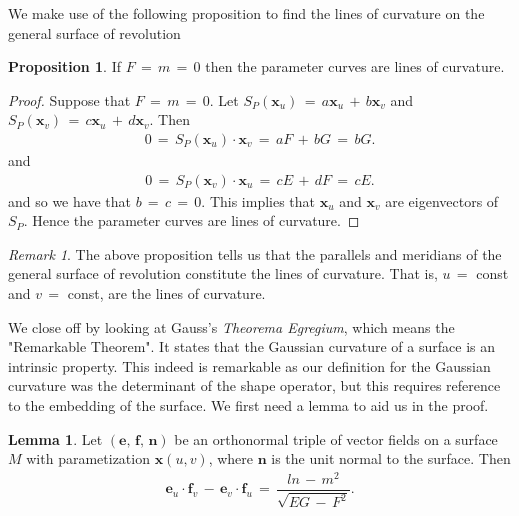 \documentclass{UKZNcomp}
\newcommand{\vect}[1]{\mathbf{#1}} %
\theoremstyle{definition}
\newtheorem{prop}[definition]{Proposition}
\newtheorem{lemma}[definition]{Lemma}
\theoremstyle{remark}
\newtheorem*{remark}{Remark}
\begin{document}
We make use of the following proposition to find the lines of curvature on the general surface of revolution

\begin{prop}
If $F\,=\,m\,=\,0$ then the parameter curves are lines of curvature.
\end{prop}

\begin{proof}
Suppose that $F\,=\,m\,=\,0$. Let $S_P(\vect x_u)\,=\,a\vect x_u\,+\,b\vect x_v$ and $S_P(\vect x_v)\,=\,c\vect x_u\,+\,d\vect x_v$. Then
\begin{align*}
0\,=\,S_P(\vect x_u)\cdot\vect x_v\,=\,aF\,+\,bG\,=\,bG.
\end{align*}
and
\begin{align*}
0\,=\,S_P(\vect x_v)\cdot\vect x_u\,=\,cE\,+\,dF\,=\,cE.
\end{align*}
and so we have that $b\,=\,c\,=\,0$. This implies that $\vect x_u$ and $\vect x_v$ are eigenvectors of $S_P$. Hence the parameter curves are lines of curvature. 
\end{proof}

\begin{remark}
The above proposition tells us that the parallels and meridians of the general surface of revolution constitute the lines of curvature. That is, $u\,=$ const and $v\,=$ const, are the lines of curvature.
\end{remark}

We close off by looking at Gauss's \textit{Theorema Egregium}, which means the "Remarkable Theorem". It states that the Gaussian curvature of a surface is an intrinsic property. This indeed is remarkable as our definition for the Gaussian curvature was the determinant of the shape operator, but this requires reference to the embedding of the surface. We first need a lemma to aid us in the proof.

\begin{lemma}\label{lem:1}
Let $(\vect e,\,\vect f,\, \vect n)$ be an orthonormal triple of vector fields on a surface $M$ with parametization $\vect x(u,v)$, where $\vect n$ is the unit normal to the surface. Then
\begin{align*}
\vect e_u\cdot \vect f_v\,-\, \vect e_v\cdot\vect f_u\,=\,\dfrac{ln\,-\,m^2}{\sqrt{EG\,-\,F^2}}.
\end{align*}
\end{lemma}
\end{document}

